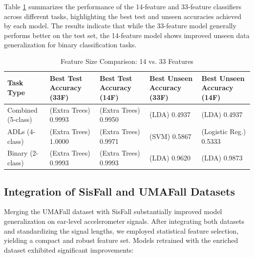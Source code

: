 \documentclass[conference]{IEEEtran}
\begin{document}
Table \ref{tab:feature-size-comparison} summarizes the performance of the 14-feature and 33-feature classifiers across different tasks, highlighting the best test and unseen accuracies achieved by each model. The results indicate that while the 33-feature model generally performs better on the test set, the 14-feature model shows improved unseen data generalization for binary classification tasks.


\begin{table}[h]
\centering
\caption{Feature Size Comparison: 14 vs. 33 Features}
\renewcommand{\arraystretch}{1.4}
\begin{tabular}{|>{\centering\arraybackslash}m{1.4cm}|m{1.5cm}|m{1.5cm}|m{1.5cm}|m{1.5cm}|}
\hline
\textbf{Task Type} & \textbf{Best Test Accuracy (33F)} & \textbf{Best Test Accuracy (14F)} & \textbf{Best Unseen Accuracy (33F)} & \textbf{Best Unseen Accuracy (14F)} \\[5pt]
\hline
Combined (5-class) & (Extra Trees) 0.9993 & (Extra Trees) 0.9950 & (LDA) 0.4937 & (LDA) 0.4937 \\[5pt] %
\hline
ADLs (4-class) & (Extra Trees) 1.0000 & (Extra Trees) 0.9971 & (SVM) 0.5867 & (Logistic Reg.) 0.5333 \\[5pt] %
\hline
Binary (2-class) & (Extra Trees) 0.9993 & (Extra Trees) 0.9993 & (LDA) 0.9620 & (LDA) 0.9873 \\[5pt] %
\hline
\end{tabular}
\label{tab:feature-size-comparison}
\end{table}
\vspace*{\fill} %

\subsection{Integration of SisFall and UMAFall Datasets}

Merging the UMAFall dataset with SisFall substantially improved model generalization on ear-level accelerometer signals. After integrating both datasets and standardizing the signal lengths, we employed statistical feature selection, yielding a compact and robust feature set. Models retrained with the enriched dataset exhibited significant improvements:
\end{document}
